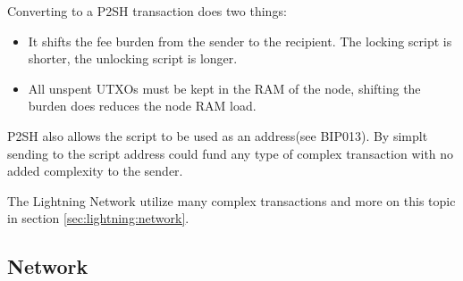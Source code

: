 Converting to a P2SH transaction does two things:

\begin{itemize}

	\item It shifts the fee burden from the sender to the recipient. The locking script is shorter, the unlocking script is longer.
	
	\item All unspent UTXOs must be kept in the RAM of the node, shifting the burden does reduces the node RAM load. 
	
\end{itemize}

P2SH also allows the script to be used as an address(see BIP013\cite{bip:0013:p2shaddr}). By simplt sending to the script address could fund any type of complex transaction with no added complexity to the sender.

The Lightning Network utilize many complex transactions and more on this topic in section \ref{sec:lightning:network}.

\subsection{Network}

